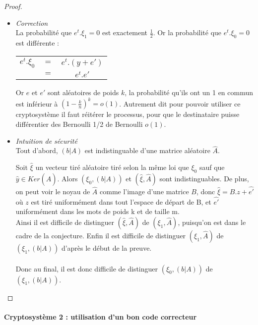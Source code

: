\documentclass{article}		%
\theoremstyle{definition}
\theoremstyle{plain}
\theoremstyle{plain}
\theoremstyle{plain}
\theoremstyle{plain}
\theoremstyle{plain}
\begin{document}
\begin{proof}
\begin{itemize}
\item \emph{Correction}
\\
La probabilité que $e^t.\xi_1=0$ est exactement $\frac{1}{2}$. Or la
probabilité que $e^t.\xi_0=0$ est différente :
\begin{center}
\begin{tabular}{c c c}
   $e^t.\xi_0$ &$ =$ &$ e^t.(y+e') $\\
      & $=$&$ e^t.e'$
  \end{tabular}
 \end{center}
Or $e$ et $e'$ sont aléatoires de poids $k$, la probabilité qu'ils ont un 1
en commun est inférieur à $(1-\frac{k}{n})^k=o(1)$.
Autrement dit pour pouvoir utiliser ce cryptosystème il faut réitérer le
processus, pour que le destinataire puisse différentier des Bernoulli 1/2
de Bernoulli $o(1)$.
\item \emph{Intuition de sécurité}
\\
Tout d'abord, $(b|A)$ est indistinguable d'une matrice aléatoire
$\hat{A}$. 


Soit $\hat{\xi}$ un vecteur tiré aléatoire tiré selon la même
loi que $\xi_0$ sauf que $\hat{y}\in Ker(\hat{A})$. Alors $(\xi_0,(b|A))$
et $(\hat{\xi},\hat{A})$ sont indistinguables.
De plus, on peut voir le noyau de $\hat{A}$ comme l'image d'une matrice
$B$, donc $\hat{\xi}=B.z+\hat{e'}$ où $z$ est tiré uniformément dans tout
l'espace de départ de B, et 
$\hat{e'}$ uniformément dans les mots de poids k et de taille m.
\\
Ainsi il est difficile de distinguer $(\hat{\xi},\hat{A})$ de
$(\xi_1,\hat{A})$, puisqu'on est dans le cadre de la conjecture.
Enfin il est difficile de distinguer $(\xi_1,\hat{A})$ de $(\xi_1,
(b|A))$ d'après le début de la preuve.
\\\\
Donc au final, il est donc difficile de
distinguer $(\xi_0,(b|A))$ de $(\xi_1 ,(b|A) )$.
\end{itemize}
\end{proof}


\paragraph{Cryptosystème 2 : utilisation d'un bon code correcteur}
\end{document}

